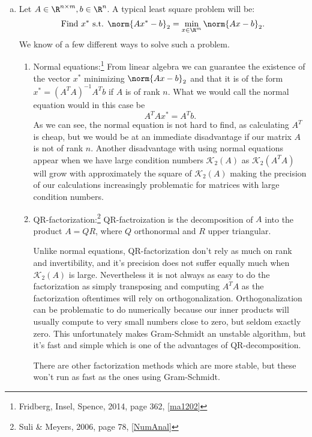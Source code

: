 \begin{enumerate}[a)]
  \item
Let $A\in \R^{n\times m}, b\in \R^{n}$. A typical least square problem will be:
  \begin{equation}
    \text{Find $x^*$ s.t. } \norm{Ax^* - b}_2 = \min_{x\in\R^m}\norm{Ax-b}_2.
  \end{equation}
We know of a few different ways to solve such a problem.
  \begin{enumerate}[(1)]
    \item Normal equations:\footnote{Fridberg, Insel, Spence, 2014, page 362, \ref{ma1202}} From linear algebra we can guarantee the existence of the vector $x^*$ minimizing $\norm{Ax-b}_2$ and that it is of the form $x^* = \left(A^TA\right)^{-1}A^Tb$ if $A$ is of rank $n$. What we would call the normal equation would in this case be
      \begin{equation}
        A^TAx^* = A^Tb.
      \end{equation}
    As we can see, the normal equation is not hard to find, as calculating $A^T$ is cheap, but we would be at an immediate disadvantage if our matrix $A$ is not of rank $n$. Another disadvantage with using normal equations appear when we have large condition numbers $\mathcal{K}_2(A)$ as $\mathcal{K}_2(A^TA)$ will grow with approximately the square of $\mathcal{K}_2(A)$ making the precision of our calculations increasingly problematic for matrices with large condition numbers.

    \item QR-factorization:\footnote{Suli \& Meyers, 2006, page 78, \ref{NumAnal}}
    QR-factroization is the decomposition of $A$ into the product $A = QR$, where $Q$ orthonormal and $R$ upper triangular.

     Unlike normal equations, QR-factorization don't rely as much on rank and invertibility, and it's precision does not suffer equally much when $\mathcal{K}_2(A)$ is large. Nevertheless it is not always as easy to do the factorization as simply transposing and computing $A^TA$ as the factorization oftentimes will rely on orthogonalization. Orthogonalization can be problematic to do numerically because our inner products will usually compute to very small numbers close to zero, but seldom exactly zero. This unfortunately makes Gram-Schmidt an unstable algorithm, but it's fast and simple which is one of the advantages of QR-decomposition.


    There are other factorization methods which are more stable, but these won't run as fast as the ones using Gram-Schmidt.

  \end{enumerate}
\end{enumerate}

